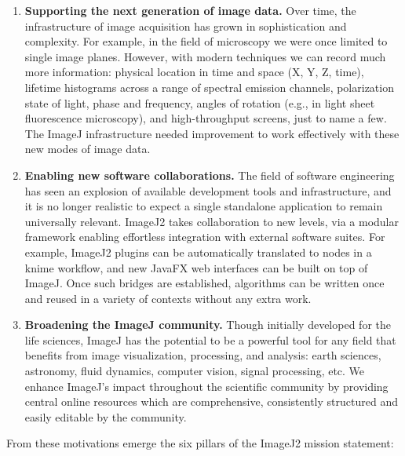 \documentclass{bmcart}
\begin{document}
\begin{enumerate}
  \item \textbf{Supporting the next generation of image data.} Over time, the
    infrastructure of image acquisition has grown in sophistication and
    complexity. For example, in the field of microscopy we were once limited to
    single image planes. However, with modern techniques we can record much
    more information: physical location in time and space (X, Y, Z, time),
    lifetime histograms across a range of spectral emission channels,
    polarization state of light, phase and frequency, angles of rotation (e.g.,
    in light sheet fluorescence microscopy), and high-throughput screens, just
    to name a few. The ImageJ infrastructure needed improvement to work
    effectively with these new modes of image data.

  \item \textbf{Enabling new software collaborations.} The field of software
    engineering has seen an explosion of available development tools and
    infrastructure, and it is no longer realistic to expect a single standalone
    application to remain universally relevant. ImageJ2 takes collaboration to
    new levels, via a modular framework enabling effortless integration with
    external software suites. For example, ImageJ2 plugins can be automatically
    translated to nodes in a \acrshort{knime} \cite{knime} workflow, and new
    JavaFX \cite{javafx} web interfaces can be built on top of ImageJ. Once
    such bridges are established, algorithms can be written once and reused in
    a variety of contexts without any extra work.

  \item \textbf{Broadening the ImageJ community.} Though initially developed
    for the life sciences, ImageJ has the potential to be a powerful tool for
    any field that benefits from image visualization, processing, and analysis:
    earth sciences, astronomy, fluid dynamics, computer vision, signal
    processing, etc. We enhance ImageJ's impact throughout the scientific
    community by providing central online resources which are comprehensive,
    consistently structured and easily editable by the community.
\end{enumerate}

From these motivations emerge the six pillars of the ImageJ2 mission
statement:
\end{document}
